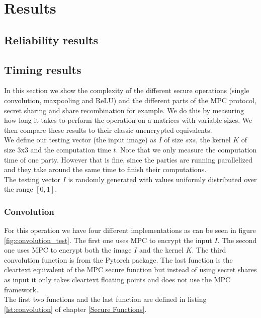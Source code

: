 \section{Results}
\subsection{Reliability results}
\subsection{Timing results}
In this section we show the complexity of the different secure operations (single convolution, maxpooling and ReLU) and the different parts of the MPC protocol, secret sharing and share recombination for example. We do this by measuring how long it takes to perform the operation on a matrices with variable sizes. We then compare these results to their classic unencrypted equivalents.\\

We define our testing vector (the input image) as $I$ of size $s$x$s$, the kernel $K$ of size $3$x$3$ and the computation time $t$. Note that we only measure the computation time of one party. However that is fine, since the parties are running parallelized and they take around the same time to finish their computations.\\

The testing vector $I$ is randomly generated with values uniformly distributed over the range $[0,1]$.

\subsubsection{Convolution}
For this operation we have four different implementations as can be seen in figure \ref{fig:convolution_test}. The first one uses MPC to encrypt the input $I$. The second one uses MPC to encrypt both the image $I$ and the kernel $K$. The third convolution function is  from the Pytorch package. The last function is the cleartext equivalent of the MPC secure function but instead of using secret shares as input it only takes cleartext floating points and does not use the MPC framework.\\

The first two functions and the last function are defined in listing \ref{lst:convolution} of chapter \ref{Secure Functions}.

